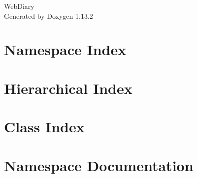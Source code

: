 \documentclass[twoside]{book}
\newcommand{\+}{\discretionary{\mbox{\scriptsize$\hookleftarrow$}}{}{}}
\newcommand{\clearemptydoublepage}{%
    \newpage{\pagestyle{empty}\cleardoublepage}%
  }
\begin{document}
  \raggedbottom
    \hypersetup{pageanchor=false,
                bookmarksnumbered=true,
                pdfencoding=unicode
               }
  \begin{titlepage}
  \vspace*{7cm}
  \begin{center}%
  {\Large Web\+Diary}\\
  \vspace*{1cm}
  {\large Generated by Doxygen 1.13.2}\\
  \end{center}
  \end{titlepage}
  \clearemptydoublepage
  \tableofcontents
  \clearemptydoublepage
  \hypersetup{pageanchor=true}

\chapter{Namespace Index}

\chapter{Hierarchical Index}

\chapter{Class Index}

\chapter{Namespace Documentation}











\end{document}
